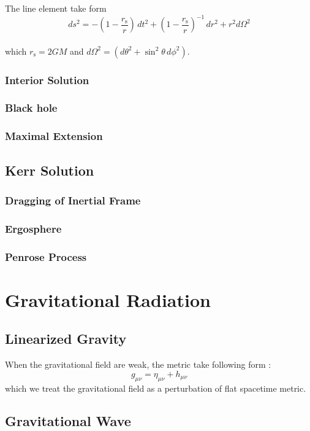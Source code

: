 \documentclass[12pt]{article}
\theoremstyle{mystyle}{\newtheorem{definition}{Definition}[section]}
\theoremstyle{mystyle}{\newtheorem{theorem}[definition]{Theorem}}
\theoremstyle{mystyle}{\newtheorem*{remark}{Remark}}
\theoremstyle{mystyle}{\newtheorem*{example}{Example}}
\theoremstyle{mystyle}{\newtheorem*{examples}{Examples}}
\theoremstyle{cstyle}{\newtheorem*{cthm}{}}
\begin{document}
\begin{cthm}
  The line element take form 
  \[ds^2 = -\left(1 - \frac{r_\mathrm{s}}{r} \right)\,dt^2 + \left(1-\frac{r_\mathrm{s}}{r}\right)^{-1} \,dr^2 + r^2 d\Omega^2\]\\
  which \(r_\mathrm{s} = 2GM\) and \(d\Omega^2 = \left(d\theta^2 + \sin^2\theta \, d\phi^2\right)\).
\end{cthm}
\subsubsection{Interior Solution}
\subsubsection{Black hole}
\subsubsection{Maximal Extension}

\subsection{Kerr Solution}

\subsubsection{Dragging of Inertial Frame}

\subsubsection{Ergosphere}

\subsubsection{Penrose Process}

\section{Gravitational Radiation}
\subsection{Linearized Gravity}
When the gravitational field are weak, the metric take following form :\[g_{\mu\nu} = \eta_{\mu\nu} + h_{\mu\nu} \]
which we treat the gravitational field as a perturbation of flat spacetime metric.
\subsection{Gravitational Wave}
\end{document}
